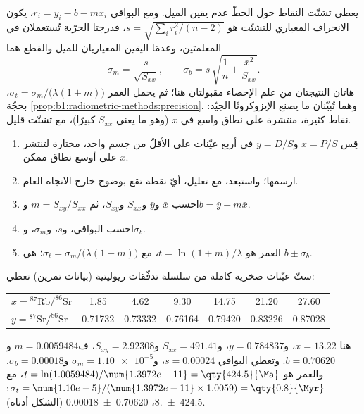 يعطي تشتّت النقاط حول الخطّ عدم يقين الميل. ومع البواقي $r_i = y_i - b - m x_i$، يكون الانحراف المعياري للتشتّت هو $s = \sqrt{\sum_i r_i^2/(n-2)}$، فدرجتا الحرّية تُستعملان في المعلمتين، وعدمَا اليقين المعياريان للميل والقطع هما
\[
  \sigma_m = \frac{s}{\sqrt{S_{xx}}}, \qquad
  \sigma_b = s\,\sqrt{\frac1n + \frac{\bar x^2}{S_{xx}}} .
\]
هاتان النتيجتان من علم الإحصاء مقبولتان هنا؛ ثم يحمل العمر $\sigma_t = \sigma_m/\bigl(\lambda(1 + m)\bigr)$، بحجّة \cref{prop:b1:radiometric-methods:precision}. وهما تُبيّنان ما يصنع الإيزوكرونًا الجيّد: نقاط كثيرة، منتشرة على نطاق واسع في $x$ (وهو ما يعني $S_{xx}$ كبيرًا)، مع تشتّت قليل.

\begin{method}\label{met:b1:radiometric-methods:isochron}
\begin{enumerate}
  \item قِس $x = P/S$ و$y = D/S$ في أربع عيّنات على الأقلّ من جسم واحد، مختارة لتنتشر $x$ على أوسع نطاق ممكن.
  \item ارسمها؛ واستبعد، مع تعليل، أيّ نقطة تقع بوضوح خارج الاتجاه العام.
  \item احسب $\bar x$ و$\bar y$ و$S_{xx}$ و$S_{xy}$، ثم $m = S_{xy}/S_{xx}$ و$b = \bar y - m \bar x$.
  \item احسب البواقي، و$s$، و$\sigma_m$، و$\sigma_b$.
  \item العمر هو $t = \ln(1+m)/\lambda$، مع $\sigma_t =
        \sigma_m/\bigl(\lambda(1+m)\bigr)$؛  هي $b \pm \sigma_b$.
\end{enumerate}
\end{method}

\begin{example}\label{ex:b1:radiometric-methods:rhyolite}
ستّ عيّنات صخرية كاملة من سلسلة تدفّقات ريوليتية (بيانات تمرين) تعطي:
\begin{center}
\small
\begin{tabular}{|l|cccccc|}
\hline
$x = {}^{87}\mathrm{Rb}/^{86}\mathrm{Sr}$ & 1.85 & 4.62 & 9.30 & 14.75 & 21.20 & 27.60 \\
$y = {}^{87}\mathrm{Sr}/^{86}\mathrm{Sr}$ & 0.71732 & 0.73332 & 0.76164 & 0.79420 & 0.83226 & 0.87028 \\
\hline
\end{tabular}
\end{center}
هنا $\bar x = 13.22$، و$\bar y = 0.784837$، و$S_{xx} = 491.41$ و$S_{xy} = 2.92308$، ف$m = 0.0059484$ و$b = 0.70620$. وتعطي البواقي $s = 0.00024$، و$\sigma_m = \num{1.10e-5}$ و$\sigma_b = 0.00018$. والعمر هو $t = \ln(1.0059484)/\num{1.3972e-11} = \qty{424.5}{\Ma}$، مع $\sigma_t = \num{1.10e-5}/(\num{1.3972e-11} \times 1.0059) = \qty{0.8}{\Myr}$: \qty[uncertainty-mode=separate]{424.5(8)}{\Ma}،  \num[uncertainty-mode=separate]{0.70620(18)} (الشكل أدناه).
\end{example}

